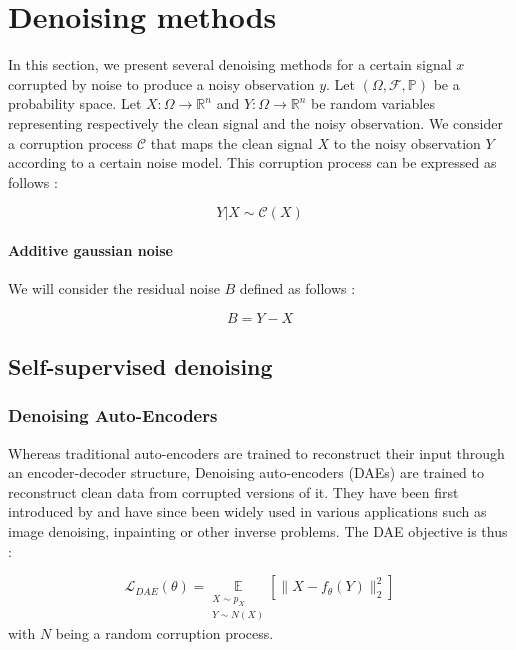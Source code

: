 \section{Denoising methods}

In this section, we present several denoising methods for a certain signal $x$ corrupted by noise to produce a noisy observation $y$.
Let $(\Omega, \mathcal{F}, \mathbb{P})$ be a probability space.
Let $X : \Omega \to \mathbb{R}^n$ and $Y : \Omega \to \mathbb{R}^n$ be random variables representing respectively the clean signal and the noisy observation.
We consider a corruption process $\mathcal{C}$ that maps the clean signal $X$ to the noisy observation $Y$ according to a certain noise model. This corruption process can be expressed as follows :

\begin{equation}
    Y | X \sim \mathcal{C}(X)
    \label{eq:noise-model}
\end{equation}

\paragraph{Additive gaussian noise}

We will consider the residual noise $B$ defined as follows :

\begin{equation}
    B = Y - X
\end{equation}

\subsection{Self-supervised denoising}

\subsubsection{Denoising Auto-Encoders}

Whereas traditional auto-encoders are trained to reconstruct their input through an encoder-decoder structure, Denoising auto-encoders (DAEs) are trained to reconstruct clean data from corrupted versions of it.
They have been first introduced by \cite{vincent_extracting_2008} and have since been widely used in various applications such as image denoising, inpainting or other inverse problems.
The DAE objective is thus :

\begin{equation}
    \mathcal{L}_{DAE}(\theta) = \underset{\substack{X \sim p_X \\ Y \sim N(X)}}{\mathbb{E}} \left[ \| X - f_{\theta}(Y) \|_2^2 \right]
\end{equation}
with $N$ being a random corruption process.

